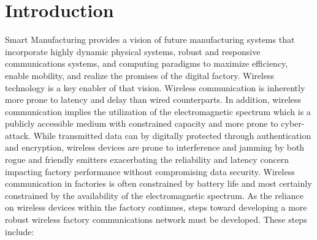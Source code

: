 \documentclass[12pt]{article}
\begin{document}
	
		\section*{Introduction}
		Smart Manufacturing provides a vision of future manufacturing systems that incorporate highly dynamic physical systems, robust and responsive communications systems, and computing paradigms to maximize efficiency, enable mobility, and realize the promises of the digital factory.  Wireless technology is a key enabler of that vision. Wireless communication is inherently more prone to latency and delay than wired counterparts.  In addition, wireless communication implies the utilization of the electromagnetic spectrum which is a publicly accessible medium with constrained capacity and more prone to cyber-attack.  While transmitted data can by digitally protected through authentication and encryption, wireless devices are prone to interference and jamming by both rogue and friendly emitters exacerbating the reliability and latency concern impacting factory performance without compromising data security.  Wireless communication in factories is often constrained by battery life and most certainly constrained by the availability of the electromagnetic spectrum.   As the reliance on wireless devices within the factory continues, steps toward developing a more robust wireless factory communications network must be developed. These steps include:
			
\end{document}
